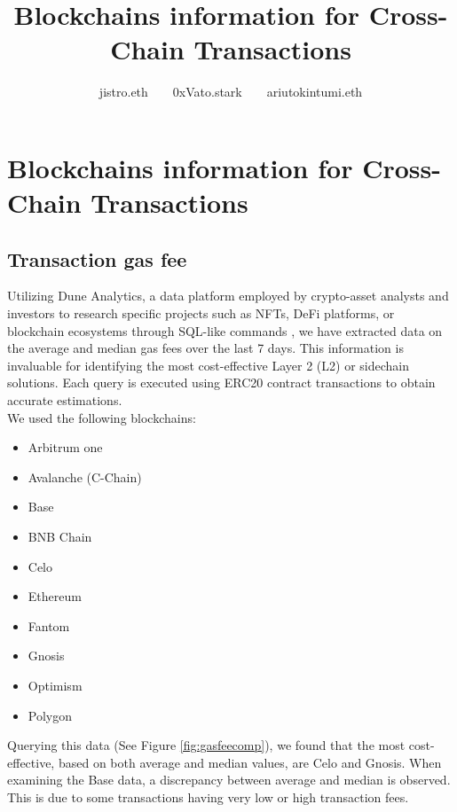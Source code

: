 \documentclass[fleqn,10pt]{olplainarticle}
\title{Blockchains information for Cross-Chain Transactions}
\author[1]{jistro.eth~~~~0xVato.stark~~~~ariutokintumi.eth}
\begin{document}
\flushbottom
\maketitle
\thispagestyle{empty}

\tableofcontents

\section{Blockchains information for Cross-Chain Transactions}

\subsection{Transaction gas fee}

Utilizing Dune Analytics, a data platform employed by crypto-asset analysts and investors to research specific projects such as NFTs, DeFi platforms, or blockchain ecosystems through SQL-like commands \cite{vasile_dune_2022}, we have extracted data on the average and median gas fees over the last 7 days. This information is invaluable for identifying the most cost-effective Layer 2 (L2) or sidechain solutions. Each query is executed using ERC20 contract transactions to obtain accurate estimations. \\ We used the following blockchains:

\begin{multicols}{3}
	\begin{itemize}[noitemsep]
		\item Arbitrum one
		\item Avalanche (C-Chain)
		\item Base
		\item BNB Chain
		\item Celo
		\item Ethereum
		\item Fantom
		\item Gnosis
		\item Optimism
		\item Polygon
	\end{itemize}
\end{multicols}

Querying this data (See Figure \ref{fig:gasfeecomp}), we found that the most cost-effective, based on both average and median values, are Celo and Gnosis. When examining the Base data, a discrepancy between average and median is observed. This is due to some transactions having very low or high transaction fees.
\end{document}
